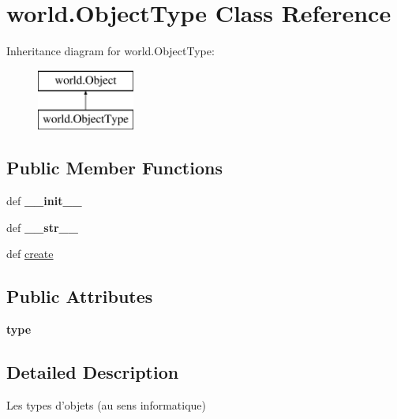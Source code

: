 \hypertarget{classworld_1_1_object_type}{\section{world.\-Object\-Type \-Class \-Reference}
\label{classworld_1_1_object_type}
}
\-Inheritance diagram for world.\-Object\-Type\-:\begin{figure}[H]
\begin{center}
\leavevmode
\includegraphics[height=2.000000cm]{classworld_1_1_object_type}
\end{center}
\end{figure}
\subsection*{\-Public \-Member \-Functions}
\begin{DoxyCompactItemize}
\item 
\hypertarget{classworld_1_1_object_type_a8e22b69e8867f70d768f1c29b5d67299}{def {\bfseries \-\_\-\-\_\-init\-\_\-\-\_\-}}\label{classworld_1_1_object_type_a8e22b69e8867f70d768f1c29b5d67299}

\item 
\hypertarget{classworld_1_1_object_type_a338113a75208a1dd1ff1e3a60fcc2dbb}{def {\bfseries \-\_\-\-\_\-str\-\_\-\-\_\-}}\label{classworld_1_1_object_type_a338113a75208a1dd1ff1e3a60fcc2dbb}

\item 
def \hyperlink{classworld_1_1_object_type_aec3659e529c2f58cc8ec05a759811015}{create}
\end{DoxyCompactItemize}
\subsection*{\-Public \-Attributes}
\begin{DoxyCompactItemize}
\item 
\hypertarget{classworld_1_1_object_type_ae9880fda72c8950d1b1b070efa72279e}{{\bfseries type}}\label{classworld_1_1_object_type_ae9880fda72c8950d1b1b070efa72279e}

\end{DoxyCompactItemize}


\subsection{\-Detailed \-Description}
\begin{DoxyVerb}Les types d'objets (au sens informatique) \end{DoxyVerb}
 

